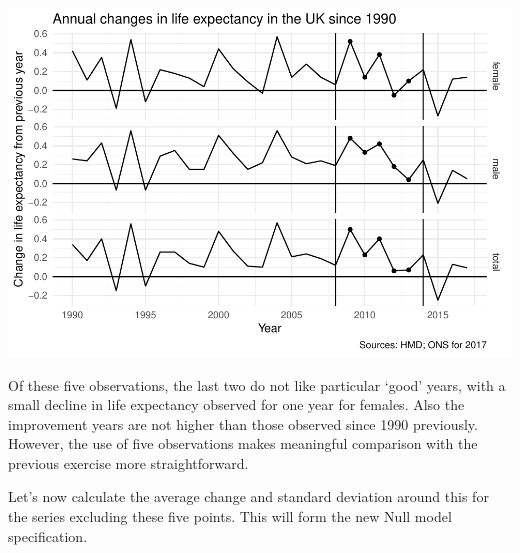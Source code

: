 \documentclass[]{article}
\newenvironment{Shaded}{\begin{snugshade}}{\end{snugshade}}
\newcommand{\KeywordTok}[1]{\textcolor[rgb]{0.13,0.29,0.53}{\textbf{#1}}}
\newcommand{\DataTypeTok}[1]{\textcolor[rgb]{0.13,0.29,0.53}{#1}}
\newcommand{\DecValTok}[1]{\textcolor[rgb]{0.00,0.00,0.81}{#1}}
\newcommand{\StringTok}[1]{\textcolor[rgb]{0.31,0.60,0.02}{#1}}
\newcommand{\OperatorTok}[1]{\textcolor[rgb]{0.81,0.36,0.00}{\textbf{#1}}}
\newcommand{\NormalTok}[1]{#1}
\begin{document}
\includegraphics{devils_advocacy_files/figure-latex/unnamed-chunk-4-1.pdf}

Of these five observations, the last two do not like particular `good'
years, with a small decline in life expectancy observed for one year for
females. Also the improvement years are not higher than those observed
since 1990 previously. However, the use of five observations makes
meaningful comparison with the previous exercise more straightforward.

Let's now calculate the average change and standard deviation around
this for the series excluding these five points. This will form the new
Null model specification.

\begin{Shaded}
\end{Shaded}
\end{document}
